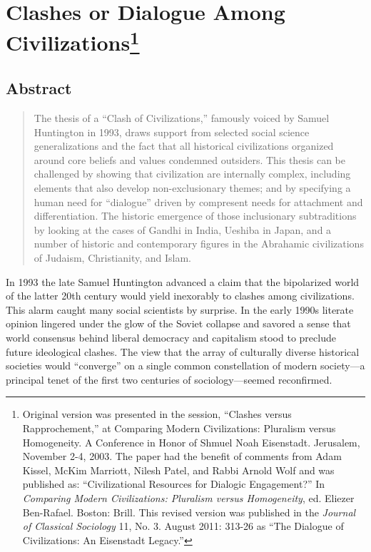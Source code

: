 \chapter[Clashes or Dialogue Among Civilizations (2011)]{Clashes or Dialogue Among Civilizations\footnote{Original version was presented in the session, ``Clashes versus Rapprochement,'' at Comparing Modern Civilizations: Pluralism versus Homogeneity. A Conference in Honor of Shmuel Noah Eisenstadt. Jerusalem, November 2-4, 2003. The paper had the benefit of comments from Adam Kissel, McKim Marriott, Nilesh Patel, and Rabbi Arnold Wolf and was published as: ``Civilizational Resources for Dialogic Engagement?'' In \emph{Comparing Modern Civilizations: Pluralism versus Homogeneity}, ed. Eliezer Ben-Rafael. Boston: Brill. This revised version was published in the \emph{Journal of Classical Sociology} 11, No. 3. August 2011: 313-26 as ``The Dialogue of Civilizations: An Eisenstadt Legacy.''}}

\section*{Abstract}

\begin{quote}
The thesis of a ``Clash of Civilizations,'' famously voiced by Samuel Huntington in 1993, draws support from selected social science generalizations and the fact that all historical civilizations organized around core beliefs and values condemned outsiders. This thesis can be challenged by showing that civilization are internally complex, including elements that also develop non-exclusionary themes; and by specifying a human need for ``dialogue'' driven by compresent needs for attachment and differentiation. The historic emergence of those inclusionary subtraditions by looking at the cases of Gandhi in India, Ueshiba in Japan, and a number of historic and contemporary figures in the Abrahamic civilizations of Judaism, Christianity, and Islam.
\end{quote}

\noindent
In 1993 the late Samuel Huntington advanced a claim that the bipolarized world of the latter 20th century would yield inexorably to clashes among civilizations. This alarm caught many social scientists by surprise. In the early 1990s literate opinion lingered under the glow of the Soviet collapse and savored a sense that world consensus behind liberal democracy and capitalism stood to preclude future ideological clashes. The view that the array of culturally diverse historical societies would ``converge'' on a single common constellation of modern society---a principal tenet of the first two centuries of sociology---seemed reconfirmed.

